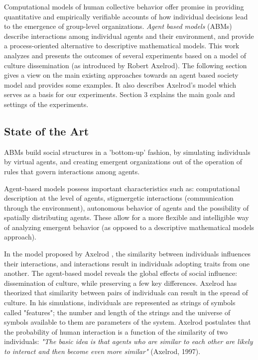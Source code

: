 \documentclass[twoside, 11pt, a4paper]{article}
\begin{document}
Computational models of human collective behavior offer promise in providing quantitative and empirically verifiable accounts of how individual decisions lead to the emergence of group-level organizations. \emph{Agent based models} (ABMs) describe interactions among individual agents and their environment, and provide a process-oriented alternative to descriptive mathematical models. 
This work analyzes and presents the outcomes of several experiments based on a model of culture dissemination (as introduced by Robert Axelrod).
The following section gives a view on the main existing approaches towards an agent based society model and provides some examples. It also describes Axelrod's model which serves as a basis for our experiments. Section 3 explains the main goals and settings of the experiments.


\subsection{State of the Art}

ABMs build social structures in a 'bottom-up' fashion, by simulating individuals by virtual agents, and creating emergent organizations out of the operation of rules that govern interactions among agents. 

Agent-based models possess important characteristics such as: computational description at the level of agents, stigmergetic interactions (communication through the environment), autonomous behavior of agents and the possibility of spatially distributing agents. These allow for a more flexible and intelligible way of analyzing emergent behavior (as opposed to a descriptive mathematical models approach).

In the model proposed by Axelrod \cite{Axelrod97}, the similarity between individuals influences their interactions, and interactions result in individuals adopting traits from one another. The agent-based model reveals the global effects of social influence: dissemination of culture, while preserving a few key differences.
Axelrod has theorized that similarity between pairs of individuals can result in the spread of culture. In his simulations, individuals are represented as strings of symbols called "features"; the number and length of the strings and the universe of symbols available to them are parameters of the system. Axelrod postulates that the probability of human interaction is a function of the similarity of two individuals: \textit{"The basic idea is that agents who are similar to each other are likely to interact and then become even more similar"} (Axelrod, 1997).
\end{document}
